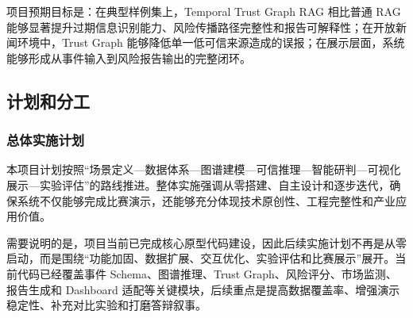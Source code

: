 ﻿\documentclass[12pt,a4paper]{article}
\begin{document}
项目预期目标是：在典型样例集上，Temporal Trust Graph RAG 相比普通 RAG 能够显著提升过期信息识别能力、风险传播路径完整性和报告可解释性；在开放新闻环境中，Trust Graph 能够降低单一低可信来源造成的误报；在展示层面，系统能够形成从事件输入到风险报告输出的完整闭环。

\subsection{计划和分工}

\subsubsection{总体实施计划}

本项目计划按照“场景定义—数据体系—图谱建模—可信推理—智能研判—可视化展示—实验评估”的路线推进。整体实施强调从零搭建、自主设计和逐步迭代，确保系统不仅能够完成比赛演示，还能够充分体现技术原创性、工程完整性和产业应用价值。

需要说明的是，项目当前已完成核心原型代码建设，因此后续实施计划不再是从零启动，而是围绕“功能加固、数据扩展、交互优化、实验评估和比赛展示”展开。当前代码已经覆盖事件 Schema、图谱推理、Trust Graph、风险评分、市场监测、报告生成和 Dashboard 适配等关键模块，后续重点是提高数据覆盖率、增强演示稳定性、补充对比实验和打磨答辩叙事。
\end{document}

